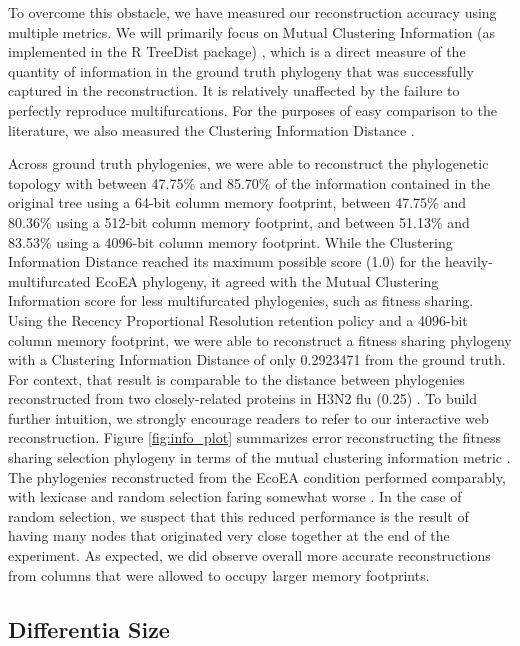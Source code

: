 To overcome this obstacle, we have measured our reconstruction accuracy using multiple metrics.
We will primarily focus on Mutual Clustering Information (as implemented in the R TreeDist package) \citep{smith2020treedist}, which is a direct measure of the quantity of information in the ground truth phylogeny that was successfully captured in the reconstruction.
It is relatively unaffected by the failure to perfectly reproduce multifurcations.
For the purposes of easy comparison to the literature, we also measured the Clustering Information Distance \citep{smith2020treedist}.



Across ground truth phylogenies, we were able to reconstruct the phylogenetic topology with between 47.75\% and 85.70\% of the information contained in the original tree using a 64-bit column memory footprint, between 47.75\% and 80.36\% using a 512-bit column memory footprint, and between 51.13\% and 83.53\% using a 4096-bit column memory footprint.
While the Clustering Information Distance reached its maximum possible score (1.0) for the heavily-multifurcated EcoEA phylogeny, it agreed with the Mutual Clustering Information score for less multifurcated phylogenies, such as fitness sharing.
Using the Recency Proportional Resolution retention policy and a 4096-bit column memory footprint, we were able to reconstruct a fitness sharing phylogeny with a Clustering Information Distance of only 0.2923471 from the ground truth.
For context, that result is comparable to the distance between phylogenies reconstructed from two closely-related proteins in H3N2 flu (0.25) \citep{jones2021parallel}.
To build further intuition, we strongly encourage readers to refer to our interactive web reconstruction.
Figure \ref{fig:info_plot} summarizes error reconstructing the fitness sharing selection phylogeny in terms of the mutual clustering information metric \citep{smith2022robust}.
The phylogenies reconstructed from the EcoEA condition performed comparably, with lexicase and random selection faring somewhat worse \citep{moreno2022hstratconceptsupplement}.
In the case of random selection, we suspect that this reduced performance is the result of having many nodes that originated very close together at the end of the experiment.
As expected, we did observe overall more accurate reconstructions from columns that were allowed to occupy larger memory footprints.

\subsection{Differentia Size}

